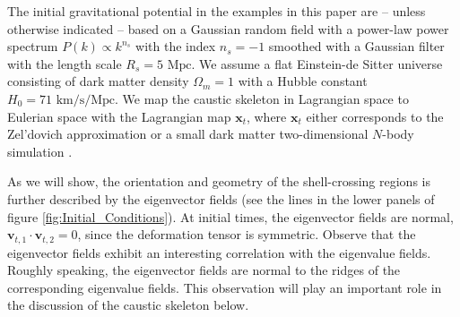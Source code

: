 \documentclass[a4paper, 11pt]{article}
\begin{document}
\begin{framed}
The initial gravitational potential in the examples in this paper are -- unless otherwise indicated -- based on a Gaussian random field with a power-law power spectrum $P(k) \propto k^{n_s}$ with the index $n_s=-1$ smoothed with a Gaussian filter with the length scale $R_s = 5\text{ Mpc}$. We assume a flat Einstein-de Sitter universe consisting of dark matter density $\Omega_m=1$ with a Hubble constant $H_0=71\text{ km/s/Mpc}$. We map the caustic skeleton in Lagrangian space to Eulerian space with the Lagrangian map $\bm{x}_t$, where $\bm{x}_t$ either corresponds to the Zel'dovich approximation or a small dark matter two-dimensional $N$-body simulation \cite{Hidding:2020}.
\end{framed}

\begin{framed}
As we will show, the orientation and geometry of the shell-crossing regions is further described by the eigenvector fields (see the lines in the lower panels of figure \ref{fig:Initial_Conditions}). At initial times, the eigenvector fields are normal, $\bm{v}_{t,1}\cdot \bm{v}_{t,2}=0$, since the deformation tensor is symmetric. Observe that the eigenvector fields exhibit an interesting correlation with the eigenvalue fields. Roughly speaking, the eigenvector fields are normal to the ridges of the corresponding eigenvalue fields. This observation will play an important role in the discussion of the caustic skeleton below. 
\end{framed}
\end{document}
